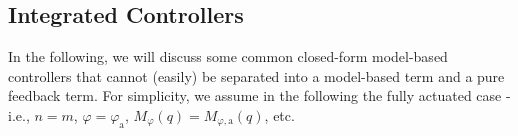 
\subsection{Integrated Controllers}\label{sub:background:model_based_control:integrated_controllers}
In the following, we will discuss some common closed-form model-based controllers that cannot (easily) be separated into a model-based term and a pure feedback term.
For simplicity, we assume in the following the fully actuated case - i.e., $n=m$, $\varphi = \varphi_\mathrm{a}$, $M_{\varphi}(q) = M_{\varphi,\mathrm{a}}(q)$, etc.

